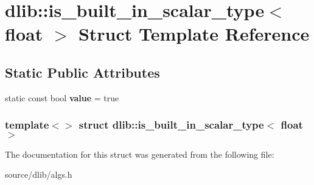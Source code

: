 \hypertarget{structdlib_1_1is__built__in__scalar__type_3_01float_01_4}{
\section{dlib::is\_\-built\_\-in\_\-scalar\_\-type$<$ float $>$ Struct Template Reference}
\label{structdlib_1_1is__built__in__scalar__type_3_01float_01_4}
}
\subsection*{Static Public Attributes}
\begin{DoxyCompactItemize}
\item 
\hypertarget{structdlib_1_1is__built__in__scalar__type_3_01float_01_4_a28caeead3cc65760f388d23bd6f2fe14}{
static const bool {\bfseries value} = true}
\label{structdlib_1_1is__built__in__scalar__type_3_01float_01_4_a28caeead3cc65760f388d23bd6f2fe14}

\end{DoxyCompactItemize}
\subsubsection*{template$<$$>$ struct dlib::is\_\-built\_\-in\_\-scalar\_\-type$<$ float $>$}



The documentation for this struct was generated from the following file:\begin{DoxyCompactItemize}
\item 
source/dlib/algs.h\end{DoxyCompactItemize}
